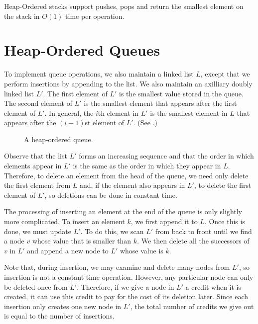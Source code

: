 \begin{thm}
Heap-Ordered stacks support pushes, pops and return the smallest element
on the stack in $O(1)$ time per operation.
\end{thm}


\section{Heap-Ordered Queues}

To implement queue operations, we also maintain a linked list $L$,
except that we perform insertions by appending to the list.  We also
maintain an axilliary doubly linked list $L'$.  The first element of
$L'$ is the smallest value stored in the queue.  The second element of
$L'$ is the smallest element that appears after the first element of
$L'$.  In general, the $i$th element in $L'$ is the smallest element
in $L$ that appears after the $(i-1)$st element of $L'$. (See
.)

\begin{figure}
\caption{A heap-ordered queue.}
\end{figure}

Observe that the list $L'$ forms an increasing sequence and that the
order in which elements appear in $L'$ is the same as the order in
which they appear in $L$.  Therefore, to delete an element from the
head of the queue, we need only delete the first element from $L$ and,
if the element also appears in $L'$, to delete the first element of
$L'$, so deletions can be done in constant time.

The processing of inserting an element at the end of the queue is only
slightly more complicated.  To insert an element $k$, we first append
it to $L$.  Once this is done, we must update $L'$.  To do this, we
scan $L'$ from back to front until we find a node $v$ whose value that
is smaller than $k$.  We then delete all the successors of $v$ in $L'$
and append a new node to $L'$ whose value is $k$.

Note that, during insertion, we may examine and delete many nodes from
$L'$, so insertion is not a constant time operation.  However, any
particular node can only be deleted once from $L'$.  Therefore, if we
give a node in $L'$ a credit when it is created, it can use this
credit to pay for the cost of its deletion later.  Since each
insertion only creates one new node in $L'$, the total number of
credits we give out is equal to the number of insertions.

